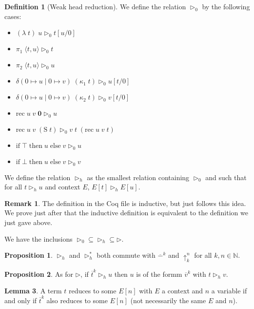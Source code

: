 \documentclass{article}
\newcommand{\ife}[3]{\mathrm{if}\;#1\;\mathrm{then}\;#2\;\mathrm{else}\;#3}
\newcommand{\bO}[0]{\boldsymbol{0}}
\newcommand{\Ss}[0]{\mathrm{S}}
\newcommand{\rec}[0]{\mathrm{rec}}
\newcommand{\Tt}[0]{\top}
\newcommand{\Ff}[0]{\bot}
\newcommand{\bN}[0]{\mathbb N}
\newcommand{\lift}[2]{\uparrow_{#1}^{#2}}
\newcommand{\deltacase}[3]{\delta(0\mapsto #1\mid 0 \mapsto #2)\;#3}
\newcommand{\flatten}[2]{\overline{#1}^{#2}}
\theoremstyle{definition}
\newtheorem{defi}{Definition}
\newtheorem{prop}{Proposition}[subsection]
\newtheorem{lem}[prop]{Lemma}
\newtheorem*{rmk}{Remark}
\begin{document}
\begin{defi}[Weak head reduction]
    We define the relation $\rhd_0$ by the following cases:
    \begin{itemize}
        \item $(\lambda\;t)\;u\rhd_0 t[u/0]$
        \item $\pi_1\;\langle t,u\rangle \rhd_0 t$
        \item $\pi_2\;\langle t,u\rangle \rhd_0 u$
        \item $\deltacase{u}{v}{(\kappa_1\;t)}\rhd_0 u[t/0]$
        \item $\deltacase{u}{v}{(\kappa_2\;t)}\rhd_0 v[t/0]$
        \item $\rec\;u\;v\;\bO\rhd_0 u$
        \item $\rec\;u\;v\;(\Ss\;t) \rhd_0 v\;t\;(\rec\;u\;v\;t)$
        \item $\ife{\Tt}{u}{v} \rhd_0 u$
        \item $\ife{\Ff}{u}{v} \rhd_0 v$
    \end{itemize}

    We define the relation $\rhd_h$ as the smallest relation containing $\rhd_0$ and such that for all
    $t\rhd_h u$ and context $E$, $E[t]\rhd_h E[u]$.
\end{defi}

\begin{rmk}
    The definition in the Coq file is inductive, but just follows this idea. We prove just after that the
    inductive definition is equivalent to the definition we just gave above.

    We have the inclusions $\rhd_0\subseteq \rhd_h\subseteq\rhd$.
\end{rmk}

\begin{prop}
    $\rhd_h$ and $\rhd_h^*$ both commute with $\flatten - k$ and $\lift k n$ for all $k,n\in\bN$.
\end{prop}

\begin{prop}
    As for $\rhd$, if $\flatten t k \rhd_h u$ then $u$ is of the formm $\flatten v k$ with $t\rhd_h v$.
\end{prop}

\begin{lem}
    A term $t$ reduces to some $E[n]$ with $E$ a context and $n$ a variable if and only if $\flatten t k$
    also reduces to some $E[n]$ (not necessarily the same $E$ and $n$).
\end{lem}
\end{document}
